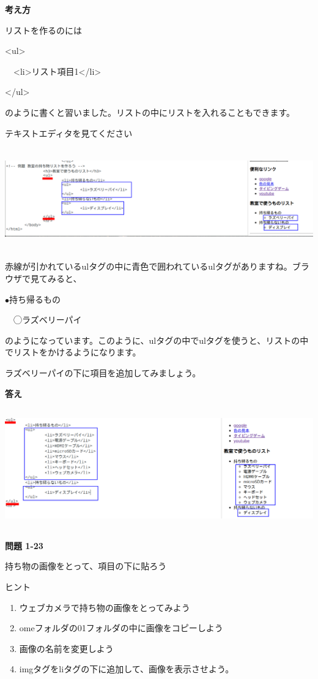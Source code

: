 \documentclass[a4paper,12pt]{jarticle}
\begin{document}
\bigskip
\flushleft

\textbf{考え方}



リストを作るのには

{\textless}ul{\textgreater}

\ \ {\textless}li{\textgreater}リスト項目1{\textless}/li{\textgreater}

{\textless}/ul{\textgreater}

のように書くと習いました。リストの中にリストを入れることもできます。

テキストエディタを見てください

\bigskip

\centering
\includegraphics[width=15.519cm,height=4.383cm]{textbook-img204.png}

\bigskip
\flushleft

赤線が引かれているulタグの中に青色で囲われているulタグがありますね。ブラウザで見てみると、

${\bullet}持ち帰るもの$

\ \ ◯ラズベリーパイ

のようになっています。このように、ulタグの中でulタグを使うと、リストの中でリストをかけるようになります。

ラズベリーパイの下に項目を追加してみましょう。


\bigskip


\clearpage\flushleft
\textbf{答え}


\bigskip

\centering
\includegraphics[width=15.937cm,height=5.186cm]{textbook-img205.png}

\bigskip
\flushleft

{\bfseries
  問題 1-23}

持ち物の画像をとって、項目の下に貼ろう

ヒント

\begin{enumerate}
  \item
        ウェブカメラで持ち物の画像をとってみよう
  \item
        omeフォルダの01フォルダの中に画像をコピーしよう
  \item 画像の名前を変更しよう
  \item
        imgタグをliタグの下に追加して、画像を表示させよう。
\end{enumerate}

\bigskip


\clearpage
\end{document}
